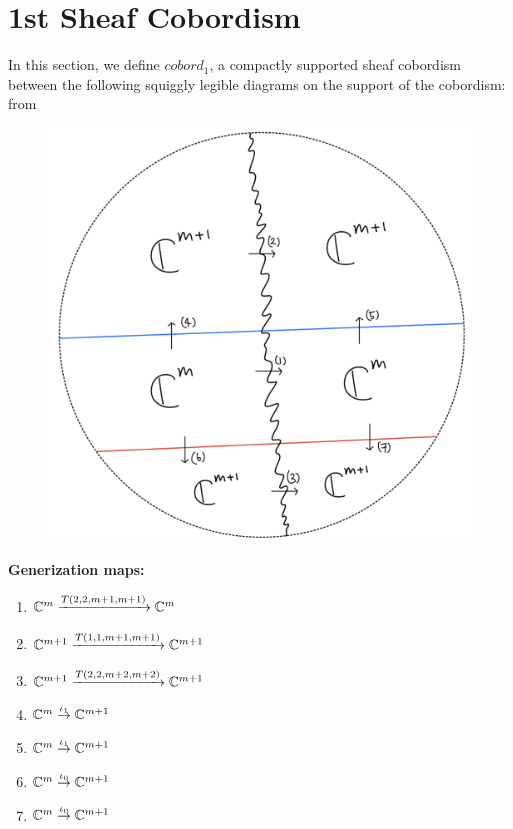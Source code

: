 \section{1st Sheaf Cobordism}
In this section, we define $cobord_1$, a compactly supported sheaf 	cobordism between the following squiggly legible diagrams on the support of the cobordism:\\
from
\begin{figure}[H]
    \centering
    \includegraphics[scale = 0.95]{diagrams/lemma1/21.png} 
    \caption{}
    \label{fig:your-label}
\end{figure}
\textbf{Generization maps:}
\begin{enumerate}[label = (\arabic*)]
\item $\mathbb{C}^m \xrightarrow{T(2,2,m+1,m+1)} \mathbb{C}^m$

\item $\mathbb{C}^{m+1} \xrightarrow{T(1,1,m+1,m+1)} \mathbb{C}^{m+1}$

\item $\mathbb{C}^{m+1} \xrightarrow{T(2,2,m+2,m+2)} \mathbb{C}^{m+1}$

\item $\mathbb{C}^{m} \overset{\iota_1}{\rightarrow} \mathbb{C}^{m+1}$

\item $\mathbb{C}^{m} \overset{\iota_1}{\rightarrow} \mathbb{C}^{m+1}$

\item $\mathbb{C}^{m} \overset{\iota_0}{\rightarrow} \mathbb{C}^{m+1}$

\item $\mathbb{C}^{m} \overset{\iota_0}{\rightarrow} \mathbb{C}^{m+1}$
\end{enumerate}
